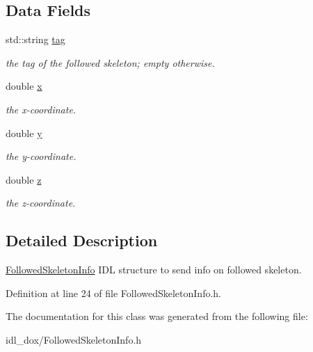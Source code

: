 \subsection*{Data Fields}
\begin{DoxyCompactItemize}
\item 
\mbox{\label{classFollowedSkeletonInfo_a6e749fa0208ef825c6b40ad6bbf825d4}} 
std\+::string \hyperlink{classFollowedSkeletonInfo_a6e749fa0208ef825c6b40ad6bbf825d4}{tag}
\begin{DoxyCompactList}\small\item\em the tag of the followed skeleton; empty otherwise. \end{DoxyCompactList}\item 
\mbox{\label{classFollowedSkeletonInfo_aa73a5373607a251d22f2fdb6078ee365}} 
double \hyperlink{classFollowedSkeletonInfo_aa73a5373607a251d22f2fdb6078ee365}{x}
\begin{DoxyCompactList}\small\item\em the x-\/coordinate. \end{DoxyCompactList}\item 
\mbox{\label{classFollowedSkeletonInfo_af988aa2cef6f97786677c2fe402def20}} 
double \hyperlink{classFollowedSkeletonInfo_af988aa2cef6f97786677c2fe402def20}{y}
\begin{DoxyCompactList}\small\item\em the y-\/coordinate. \end{DoxyCompactList}\item 
\mbox{\label{classFollowedSkeletonInfo_a83222015ccfa4b8865f935d6ef777717}} 
double \hyperlink{classFollowedSkeletonInfo_a83222015ccfa4b8865f935d6ef777717}{z}
\begin{DoxyCompactList}\small\item\em the z-\/coordinate. \end{DoxyCompactList}\end{DoxyCompactItemize}


\subsection{Detailed Description}
\hyperlink{classFollowedSkeletonInfo}{Followed\+Skeleton\+Info} I\+DL structure to send info on followed skeleton. 

Definition at line 24 of file Followed\+Skeleton\+Info.\+h.



The documentation for this class was generated from the following file\+:\begin{DoxyCompactItemize}
\item 
idl\+\_\+dox/Followed\+Skeleton\+Info.\+h\end{DoxyCompactItemize}
